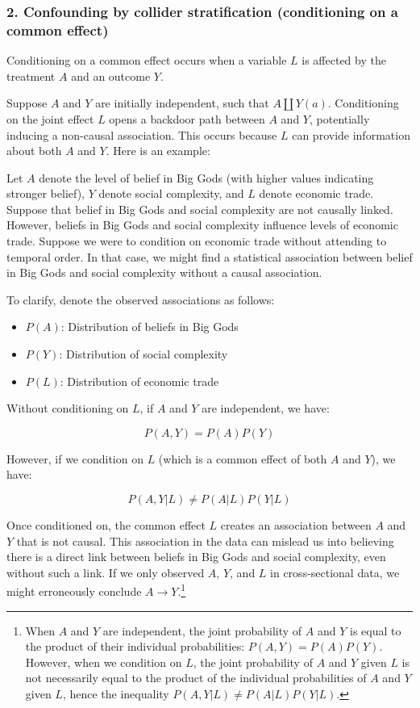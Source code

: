 \documentclass[
  singlecolumn]{article}
\providecommand{\tightlist}{%
  \setlength{\itemsep}{0pt}\setlength{\parskip}{0pt}}\usepackage{longtable,booktabs,array}
\begin{document}
\hypertarget{confounding-by-collider-stratification-conditioning-on-a-common-effect}{%
\subsubsection{2. Confounding by collider stratification (conditioning
on a common
effect)}\label{confounding-by-collider-stratification-conditioning-on-a-common-effect}}

Conditioning on a common effect occurs when a variable \(L\) is affected
by the treatment \(A\) and an outcome \(Y\).

Suppose \(A\) and \(Y\) are initially independent, such that
\(A \coprod Y(a)\). Conditioning on the joint effect \(L\) opens a
backdoor path between \(A\) and \(Y\), potentially inducing a non-causal
association. This occurs because \(L\) can provide information about
both \(A\) and \(Y\). Here is an example:

Let \(A\) denote the level of belief in Big Gods (with higher values
indicating stronger belief), \(Y\) denote social complexity, and \(L\)
denote economic trade. Suppose that belief in Big Gods and social
complexity are not causally linked. However, beliefs in Big Gods and
social complexity influence levels of economic trade. Suppose we were to
condition on economic trade without attending to temporal order. In that
case, we might find a statistical association between belief in Big Gods
and social complexity without a causal association.

To clarify, denote the observed associations as follows:

\begin{itemize}
\tightlist
\item
  \(P(A)\): Distribution of beliefs in Big Gods
\item
  \(P(Y)\): Distribution of social complexity
\item
  \(P(L)\): Distribution of economic trade
\end{itemize}

Without conditioning on \(L\), if \(A\) and \(Y\) are independent, we
have:

\[P(A, Y) = P(A)P(Y)\]

However, if we condition on \(L\) (which is a common effect of both
\(A\) and \(Y\)), we have:

\[P(A, Y | L) \neq P(A | L)P(Y | L)\]

Once conditioned on, the common effect \(L\) creates an association
between \(A\) and \(Y\) that is not causal. This association in the data
can mislead us into believing there is a direct link between beliefs in
Big Gods and social complexity, even without such a link. If we only
observed \(A\), \(Y\), and \(L\) in cross-sectional data, we might
erroneously conclude \(A \to Y\).\footnote{When \(A\) and \(Y\) are
  independent, the joint probability of \(A\) and \(Y\) is equal to the
  product of their individual probabilities: \(P(A, Y) = P(A)P(Y)\).
  However, when we condition on \(L\), the joint probability of \(A\)
  and \(Y\) given \(L\) is not necessarily equal to the product of the
  individual probabilities of \(A\) and \(Y\) given \(L\), hence the
  inequality \(P(A, Y | L) \neq P(A | L)P(Y | L)\).}
\end{document}

